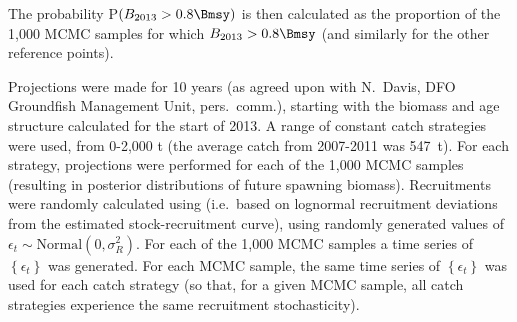 The probability P$(B_{2013} > 0.8 \Bmsy)$ is then calculated as the proportion of the 1,000 MCMC samples for which $B_{2013} > 0.8 \Bmsy$ (and similarly for the other reference points).

Projections were made for 10 years (as agreed upon with N.~Davis, DFO Groundfish Management Unit, pers.~comm.), starting with the biomass and age structure calculated for the start of 2013.  A range of constant catch strategies were used, from 0-2,000 t (the average catch from 2007-2011 was 547~t). For each strategy, projections were performed for each of the 1,000 MCMC samples (resulting in posterior distributions of future spawning biomass). Recruitments were randomly calculated using  (i.e.~based on lognormal recruitment deviations from the estimated stock-recruitment curve), using randomly generated values of $\epsilon_t \sim \mbox{Normal}(0, \sigma_R^2)$. For each of the 1,000 MCMC samples a time series of $\left\{ \epsilon_t \right\}$ was generated. For each MCMC sample, the same time series of $\left\{ \epsilon_t \right\}$ was used for each catch strategy (so that, for a given MCMC sample, all catch strategies experience the same recruitment stochasticity).



